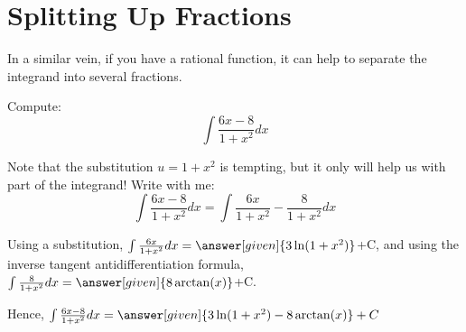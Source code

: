 \documentclass[nooutcomes]{ximera}
\begin{document}
%

\section{Splitting Up Fractions}

In a similar vein, if you have a rational function, it can help to separate the
integrand into several fractions.

\begin{example}
  Compute:
  \[
  \int \frac{6x-8}{1+x^2} dx
  \]
 
  \begin{explanation}
    Note that the substitution $u= 1+x^2$ is tempting, but it only will help us with part of the integrand!  Write with me:
    \[ \int \frac{6x-8}{1+x^2} dx = \int \frac{6x}{1+x^2}-\frac{8}{1+x^2} dx \]
      
Using a substitution, $ \int \frac{6x}{1+x^2} dx = \answer[given]{3 \ln(1+x^2)}$+C, and using the inverse tangent antidifferentiation formula, $ \int \frac{8}{1+x^2} dx = \answer[given]{8 \arctan(x)}$+C.

Hence, $\int \frac{6x-8}{1+x^2} dx =  \answer[given]{3 \ln(1+x^2)- 8 \arctan(x)}+C$
  \end{explanation}
\end{example}
\end{document}
